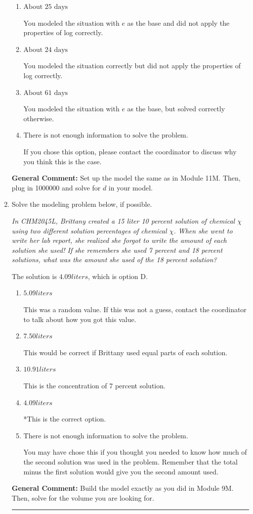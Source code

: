 \documentclass{extbook}[14pt]
\newcommand{\litem}[1]{\item #1

\rule{\textwidth}{0.4pt}}
\begin{document}
\begin{enumerate}
{\begin{enumerate}[label=\Alph*.]
* This is the correct option.
\item \( \text{About } 25 \text{ days} \)

You modeled the situation with $e$ as the base and did not apply the properties of log correctly.
\item \( \text{About } 24 \text{ days} \)

You modeled the situation correctly but did not apply the properties of log correctly.
\item \( \text{About } 61 \text{ days} \)

You modeled the situation with $e$ as the base, but solved correctly otherwise.
\item \( \text{There is not enough information to solve the problem.} \)

If you chose this option, please contact the coordinator to discuss why you think this is the case.
\end{enumerate}

\textbf{General Comment:} Set up the model the same as in Module 11M. Then, plug in 1000000 and solve for $d$ in your model.
}
\litem{
Solve the modeling problem below, if possible.

\begin{center}
    \textit{ In CHM2045L, Brittany created a 15 liter 10 percent solution of chemical $\chi$ using two different solution percentages of chemical $\chi$. When she went to write her lab report, she realized she forgot to write the amount of each solution she used! If she remembers she used 7 percent and 18 percent solutions, what was the amount she used of the 18 percent solution? }
\end{center}
The solution is \( 4.09 liters \), which is option D.\begin{enumerate}[label=\Alph*.]
\item \( 5.09 liters \)

This was a random value. If this was not a guess, contact the coordinator to talk about how you got this value.
\item \( 7.50 liters \)

This would be correct if Brittany used equal parts of each solution.
\item \( 10.91 liters \)

This is the concentration of 7 percent solution.
\item \( 4.09 liters \)

*This is the correct option.
\item \( \text{There is not enough information to solve the problem.} \)

You may have chose this if you thought you needed to know how much of the second solution was used in the problem. Remember that the total minus the first solution would give you the second amount used.
\end{enumerate}

\textbf{General Comment:} Build the model exactly as you did in Module 9M. Then, solve for the volume you are looking for.
}
\end{enumerate}
\end{document}
